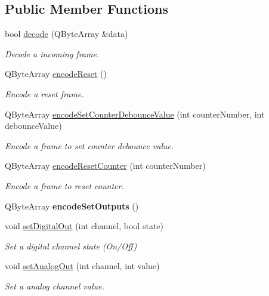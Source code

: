 \subsection*{Public Member Functions}
\begin{DoxyCompactItemize}
\item 
bool \hyperlink{classmdt_frame_codec_k8055_a9dfe60529b0e80d5bbd3852fdea51b18}{decode} (QByteArray \&data)
\begin{DoxyCompactList}\small\item\em Decode a incoming frame. \end{DoxyCompactList}\item 
\hypertarget{classmdt_frame_codec_k8055_ab2dbd6a524f0523902f95db665ff486b}{
QByteArray \hyperlink{classmdt_frame_codec_k8055_ab2dbd6a524f0523902f95db665ff486b}{encodeReset} ()}
\label{classmdt_frame_codec_k8055_ab2dbd6a524f0523902f95db665ff486b}

\begin{DoxyCompactList}\small\item\em Encode a reset frame. \end{DoxyCompactList}\item 
QByteArray \hyperlink{classmdt_frame_codec_k8055_aa88f104ba85532c17eaf3c2dbacb8530}{encodeSetCounterDebounceValue} (int counterNumber, int debounceValue)
\begin{DoxyCompactList}\small\item\em Encode a frame to set counter debounce value. \end{DoxyCompactList}\item 
QByteArray \hyperlink{classmdt_frame_codec_k8055_a99fd4cc7eaed0c7d83c4f66a8ecd6268}{encodeResetCounter} (int counterNumber)
\begin{DoxyCompactList}\small\item\em Encode a frame to reset counter. \end{DoxyCompactList}\item 
\hypertarget{classmdt_frame_codec_k8055_aae8b095b69addd5e4c501ba3d7fe0fe0}{
QByteArray {\bfseries encodeSetOutputs} ()}
\label{classmdt_frame_codec_k8055_aae8b095b69addd5e4c501ba3d7fe0fe0}

\item 
void \hyperlink{classmdt_frame_codec_k8055_a81e04679d7eca9771c7516f052490942}{setDigitalOut} (int channel, bool state)
\begin{DoxyCompactList}\small\item\em Set a digital channel state (On/Off) \end{DoxyCompactList}\item 
void \hyperlink{classmdt_frame_codec_k8055_a3cecf2bec01386ebf9f1d99b738118e1}{setAnalogOut} (int channel, int value)
\begin{DoxyCompactList}\small\item\em Set a analog channel value. \end{DoxyCompactList}\end{DoxyCompactItemize}


